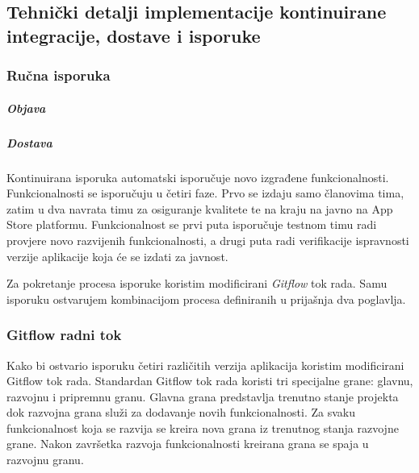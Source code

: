 \documentclass[times, utf8, diplomski, numeric]{fer}
\begin{document}
\begin{appendices}



\chapter{Tehnički detalji implementacije kontinuirane integracije, dostave i isporuke}


\subsection{Ručna isporuka} \label{header:RučnaImplementacijaIsporuke}


\paragraph{Objava} \label{header:rucna_objaca}



\paragraph{Dostava}

Kontinuirana isporuka automatski isporučuje novo izgrađene funkcionalnosti. Funkcionalnosti se isporučuju u četiri faze. Prvo se izdaju samo članovima tima, zatim u dva navrata timu za osiguranje kvalitete te na kraju na javno na App Store platformu. Funkcionalnost se prvi puta isporučuje testnom timu radi provjere novo razvijenih funkcionalnosti, a drugi puta radi verifikacije ispravnosti verzije aplikacije koja će se izdati za javnost.

Za pokretanje procesa isporuke koristim modificirani \textit{Gitflow} tok rada. Samu isporuku ostvarujem kombinacijom procesa definiranih u prijašnja dva poglavlja.

\subsection{Gitflow radni tok}

Kako bi ostvario isporuku četiri različitih verzija aplikacija koristim modificirani Gitflow tok rada. Standardan Gitflow tok rada koristi tri specijalne grane: glavnu, razvojnu i pripremnu granu. Glavna grana predstavlja trenutno stanje projekta dok razvojna grana služi za dodavanje novih funkcionalnosti. Za svaku funkcionalnost koja se razvija se kreira nova grana iz trenutnog stanja razvojne grane. Nakon završetka razvoja funkcionalnosti kreirana grana se spaja u razvojnu granu.


\end{appendices}
\end{document}
